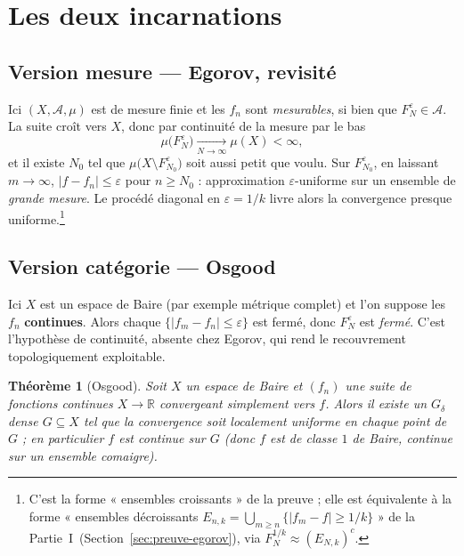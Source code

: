 \documentclass[11pt,a4paper]{article}
\theoremstyle{plain}
\newtheorem{theoreme}{Théorème}
\theoremstyle{definition}
\newcommand{\R}{\mathbb{R}}
\newcommand{\A}{\mathcal{A}}
\newcommand{\1}{\mathbf{1}}
\newcommand{\abs}[1]{\left|#1\right|}
\begin{document}
\section{Les deux incarnations}

\subsection*{Version mesure --- Egorov, revisité}

Ici $(X,\A,\mu)$ est de mesure finie et les $f_n$ sont \emph{mesurables}, si bien
que $F_N^{\varepsilon}\in\A$. La suite croît vers $X$, donc par continuité de la
mesure par le bas
\[
  \mu\bigl(F_N^{\varepsilon}\bigr)\xrightarrow[N\to\infty]{}\mu(X)<\infty,
\]
et il existe $N_0$ tel que $\mu\bigl(X\setminus F_{N_0}^{\varepsilon}\bigr)$ soit
aussi petit que voulu. Sur $F_{N_0}^{\varepsilon}$, en laissant $m\to\infty$,
$\abs{f-f_n}\le\varepsilon$ pour $n\ge N_0$ : approximation $\varepsilon$-uniforme
sur un ensemble de \emph{grande mesure}. Le procédé diagonal en $\varepsilon=1/k$
livre alors la convergence presque uniforme.\footnote{C'est la forme « ensembles
croissants » de la preuve ; elle est équivalente à la forme « ensembles
décroissants $E_{n,k}=\bigcup_{m\ge n}\{\abs{f_m-f}\ge1/k\}$ » de la
Partie~I~(Section~\ref{sec:preuve-egorov}), via $F_N^{1/k}\approx (E_{N,k})^{c}$.}

\subsection*{Version catégorie --- Osgood}

Ici $X$ est un espace de Baire (par exemple métrique complet) et l'on suppose les
$f_n$ \textbf{continues}. Alors chaque $\{\abs{f_m-f_n}\le\varepsilon\}$ est fermé,
donc $F_N^{\varepsilon}$ est \emph{fermé}. C'est l'hypothèse de continuité, absente
chez Egorov, qui rend le recouvrement topologiquement exploitable.

\begin{theoreme}[Osgood]\label{th:osgood}
Soit $X$ un espace de Baire et $(f_n)$ une suite de fonctions continues
$X\to\R$ convergeant simplement vers $f$. Alors il existe un $G_\delta$ dense
$G\subseteq X$ tel que la convergence soit localement uniforme en chaque point de
$G$ ; en particulier $f$ est continue sur $G$ (donc $f$ est de classe $1$ de Baire,
continue sur un ensemble comaigre).
\end{theoreme}
\end{document}
